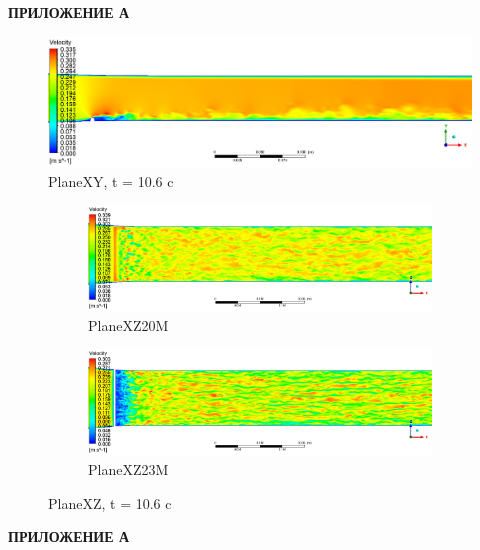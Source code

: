 \newpage
\begin{flushright}
	\MakeUppercase{\textbf{Приложение А}}
\end{flushright}
\begin{figure}[H]
	\centering
	\includegraphics[width=0.9\linewidth]{../Assets/T1060_Velocity_ContourXY}
	\caption{PlaneXY, t = 10.6 c}
	\label{fig:t1060velocitycontourxy}
\end{figure}
\begin{figure}[H]
	\begin{subfigure}{.5\textwidth}
		\centering
		\includegraphics[width=1.7\linewidth, angle=90]{../Assets/T1060_Velocity_ContourXZ20M}
		\caption{PlaneXZ20M}
		\label{fig:t1060velocitycontourxz20m}
	\end{subfigure}%
	\begin{subfigure}{.5\textwidth}
		\centering
		\includegraphics[width=1.7\linewidth, angle=90]{../Assets/T1060_Velocity_ContourXZ23M}
		\caption{PlaneXZ23M}
		\label{fig:t1060velocitycontourxz23m}
	\end{subfigure}
	\caption{PlaneXZ, t = 10.6 c}
	\label{fig:t1060velocitycontourxz}
\end{figure}
\newpage
\begin{flushright}
	\MakeUppercase{\textbf{Приложение А}}
\end{flushright}
